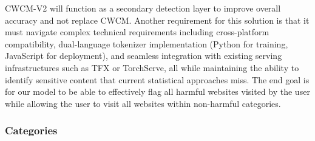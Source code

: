 \documentclass[
  titlepage]{article}
\begin{document}
CWCM-V2 will function as a secondary detection layer to improve overall
accuracy and not replace CWCM. Another requirement for this solution is
that it must navigate complex technical requirements including
cross-platform compatibility, dual-language tokenizer implementation
(Python for training, JavaScript for deployment), and seamless
integration with existing serving infrastructures such as TFX or
TorchServe, all while maintaining the ability to identify sensitive
content that current statistical approaches miss. The end goal is for
our model to be able to effectively flag all harmful websites visited by
the user while allowing the user to visit all websites within
non-harmful categories.

\subsubsection{Categories}\label{categories}
\end{document}
